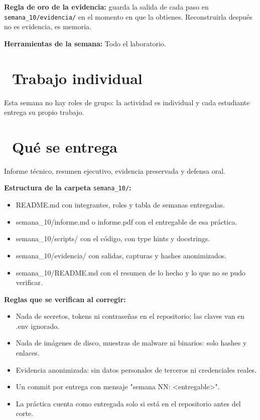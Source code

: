 \documentclass[11pt,a4paper]{article}
\newcommand{\iconotexto}[2]{\textcolor{cyanNeon}{\faIcon{#1}}~#2}
\begin{document}
\begin{cajaConcepto}\textbf{Regla de oro de la evidencia:} guarda la salida de cada paso en \texttt{semana\_10/evidencia/} en el momento en que la obtienes. Reconstruirla después no es evidencia, es memoria.
\end{cajaConcepto}

\textbf{Herramientas de la semana:} Todo el laboratorio.

\section{\iconotexto{user}{Trabajo individual}}

Esta semana no hay roles de grupo: la actividad es individual y cada estudiante entrega su propio trabajo.

\section{\iconotexto{box-open}{Qué se entrega}}

Informe técnico, resumen ejecutivo, evidencia preservada y defensa oral.

\textbf{Estructura de la carpeta} \texttt{semana\_10/}\textbf{:}

\begin{itemize}[leftmargin=1.4em,itemsep=2pt,topsep=3pt]
  \item README.md con integrantes, roles y tabla de semanas entregadas.
  \item semana\_10/informe.md o informe.pdf con el entregable de esa práctica.
  \item semana\_10/scripts/ con el código, con type hints y docstrings.
  \item semana\_10/evidencia/ con salidas, capturas y hashes anonimizados.
  \item semana\_10/README.md con el resumen de lo hecho y lo que no se pudo verificar.
\end{itemize}

\textbf{Reglas que se verifican al corregir:}

\begin{itemize}[leftmargin=1.4em,itemsep=2pt,topsep=3pt]
  \item Nada de secretos, tokens ni contraseñas en el repositorio; las claves van en .env ignorado.
  \item Nada de imágenes de disco, muestras de malware ni binarios: solo hashes y enlaces.
  \item Evidencia anonimizada: sin datos personales de terceros ni credenciales reales.
  \item Un commit por entrega con mensaje "semana NN: \textless{}entregable\textgreater{}".
  \item La práctica cuenta como entregada solo si está en el repositorio antes del corte.
\end{itemize}
\end{document}
